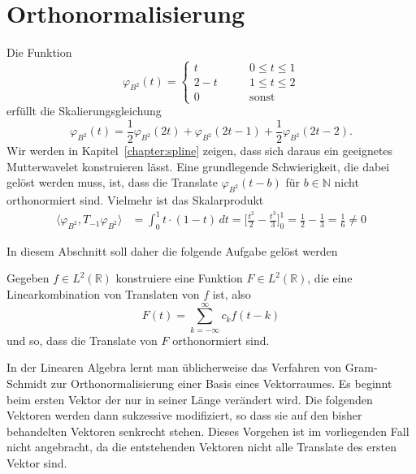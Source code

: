 %
%
%
\section{Orthonormalisierung
\label{section:orthonormalisierung}}
Die Funktion
\[
\varphi_{B^2}(t)
=
\begin{cases}
  t&\qquad 0\le t \le 1\\
2-t&\qquad 1\le t \le 2\\
  0&\qquad \text{sonst}
\end{cases}
\]
erfüllt die Skalierungsgleichung
\[
\varphi_{B^2}(t)
= 
\frac12\varphi_{B^2}(2t)
+
\varphi_{B^2}(2t-1)
+
\frac12\varphi_{B^2}(2t-2).
\]
Wir werden in Kapitel~\ref{chapter:spline} zeigen, dass sich daraus ein
geeignetes Mutterwavelet konstruieren lässt.
Eine grundlegende Schwierigkeit, die dabei gelöst werden muss, ist, dass
die Translate $\varphi_{B^2}(t-b)$ für $b\in\mathbb N$ nicht orthonormiert
sind.
Vielmehr ist das Skalarprodukt
\begin{align*}
\langle \varphi_{B^2}, T_{-1}\varphi_{B^2}\rangle
&=
\int_0^1 t\cdot (1-t)\,dt
=
\biggl[
\frac{t^2}{2}-\frac{t^3}{3}
\biggl]_0^1
=
\frac12-\frac13 = \frac16\ne 0
\end{align*}


In diesem Abschnitt soll daher die folgende Aufgabe gelöst werden
\begin{aufgabe}
\label{aufgabe:orthonormalisierung}
Gegeben $f\in L^2(\mathbb R)$ konstruiere eine Funktion 
$F\in L^2(\mathbb R)$, die eine Linearkombination von 
Translaten von $f$ ist, also
\[
F(t) = \sum_{k=-\infty}^\infty c_k f(t-k)
\]
und so, dass die Translate von $F$ orthonormiert sind.
\end{aufgabe}

In der Linearen Algebra lernt man üblicherweise das Verfahren von
Gram-Schmidt zur Orthonormalisierung einer Basis eines Vektorraumes.
Es beginnt beim ersten Vektor der nur in seiner Länge verändert wird.
Die folgenden Vektoren werden dann sukzessive modifiziert, so dass sie
auf den bisher behandelten Vektoren senkrecht stehen.
Dieses Vorgehen ist im vorliegenden Fall nicht angebracht, da die
entstehenden Vektoren nicht alle Translate des ersten Vektor sind.

